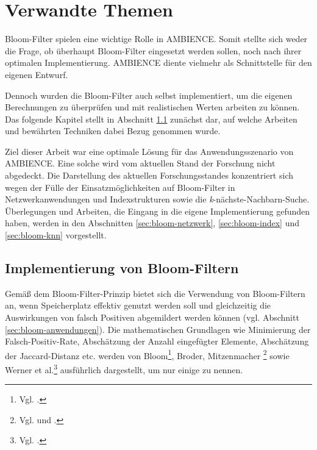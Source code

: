 \chapter{Verwandte Themen}\label{ch:related}
Bloom-Filter spielen eine wichtige Rolle in AMBIENCE. Somit stellte sich weder die Frage, ob überhaupt Bloom-Filter eingesetzt werden sollen, noch nach ihrer optimalen Implementierung. AMBIENCE diente vielmehr als Schnittstelle für den eigenen Entwurf. 

Dennoch wurden die Bloom-Filter auch selbst implementiert, um die eigenen Berechnungen zu überprüfen und mit realistischen Werten arbeiten zu können. Das folgende Kapitel stellt in Abschnitt \ref{sec:bloom-implementierung} zunächst dar, auf welche Arbeiten und bewährten Techniken dabei Bezug genommen wurde. 

Ziel dieser Arbeit war eine optimale Lösung für das Anwendungsszenario von AMBIENCE. Eine solche wird vom aktuellen Stand der Forschung nicht abgedeckt. Die Darstellung des aktuellen Forschungsstandes konzentriert  sich wegen der Fülle der Einsatzmöglichkeiten auf Bloom-Filter in Netzwerkanwendungen und Indexstrukturen sowie die \textit{k}-nächste-Nachbarn-Suche. Überlegungen und Arbeiten, die Eingang in die eigene Implementierung gefunden haben, werden in den Abschnitten \ref{sec:bloom-netzwerk}, \ref{sec:bloom-index} und \ref{sec:bloom-knn} vorgestellt. 
\section{Implementierung von Bloom-Filtern}\label{sec:bloom-implementierung}
Gemäß dem Bloom-Filter-Prinzip bietet sich die Verwendung von Bloom-Filtern an, wenn Speicherplatz effektiv genutzt werden soll und gleichzeitig die Auswirkungen von falsch Positiven abgemildert werden können (vgl. Abschnitt \ref{sec:bloom-anwendungen}). Die mathematischen Grundlagen wie Minimierung der Falsch-Positiv-Rate, Abschätzung der Anzahl eingefügter Elemente, Abschätzung der Jaccard-Distanz etc. werden von Bloom\footnote{Vgl. \cite{Bloom1970}.}, Broder, Mitzenmacher \footnote{Vgl. \cite{Broder2004} und \cite{Mitzenmacher2002}.} sowie Werner et al.\footnote{Vgl. \cite{Werner2015}.} ausführlich dargestellt, um nur einige zu nennen. 

